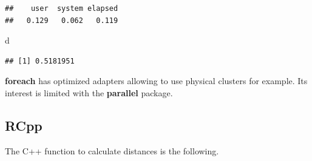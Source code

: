 \documentclass[
  12pt,
  american,
  a4paper,
  extrafontsizes,onecolumn,openright
  ]{memoir}
\newenvironment{Shaded}{\begin{snugshade}}{\end{snugshade}}
\newcommand{\NormalTok}[1]{#1}
\begin{document}
\begin{verbatim}
##    user  system elapsed 
##   0.129   0.062   0.119
\end{verbatim}

\begin{Shaded}
\begin{Highlighting}[]
\NormalTok{d}
\end{Highlighting}
\end{Shaded}

\begin{verbatim}
## [1] 0.5181951
\end{verbatim}

\normalsize

\textbf{foreach} has optimized adapters allowing to use physical clusters for example.
Its interest is limited with the \textbf{parallel} package.

\hypertarget{rcpp}{%
\subsection{RCpp}\label{rcpp}}

The C++ function to calculate distances is the following.

\scriptsize
\end{document}
